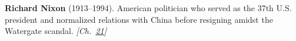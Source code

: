 \textbf{Richard Nixon} (1913–1994). American politician who served as the 37th U.S. president and normalized relations with China before resigning amidst the Watergate scandal. \emph{[Ch.~\hyperref[ch:exponentialmapslietheory]{21}]}

